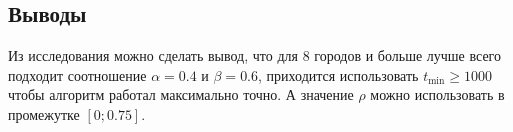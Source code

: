 \subsection{Выводы}

Из исследования можно сделать вывод, что для 8 городов и больше
лучше всего подходит соотношение $\alpha = 0.4$ и $\beta = 0.6$,
приходится использовать $t_{\min} \geq 1000$ чтобы алгоритм работал
максимально точно. А значение $\rho$ можно
использовать в промежутке $[0 ; 0.75]$.
